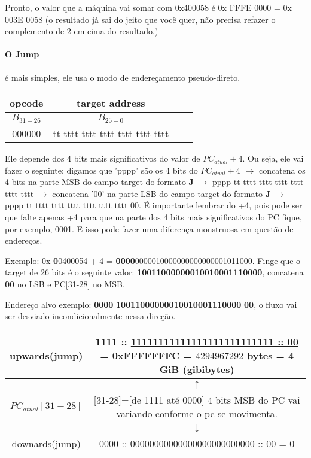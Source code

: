 \documentclass{article}
\begin{document}
Pronto, o valor que a máquina vai somar com 0x400058 é 0x FFFE 0000 = 0x 003E 
0058 (o resultado já sai do jeito que você quer, não precisa refazer o 
complemento de 2 em cima do resultado.)

\paragraph{O Jump} é mais simples, ele usa o modo de endereçamento 
pseudo-direto.

\begin{table}[ht!]
  \begin{tabular}{|c|c|c|c|}
    \hline opcode & target address \\ 
    \hline $B_{31-26}$ & $B_{25-0}$ \\ 
    \hline 000000 & tt tttt tttt tttt tttt tttt tttt \\ 
    \hline
  \end{tabular}
\end{table}

Ele depende dos 4 bits mais significativos do valor de $PC_{atual} + 4$. Ou 
seja, ele vai fazer o seguinte: digamos que 'pppp' são os 4 bits do $PC_{atual} 
+ 4$ $\rightarrow$ concatena os 4 bits na parte MSB do campo target do formato
\textbf{J} $\rightarrow$ pppp tt tttt tttt tttt tttt tttt tttt $\rightarrow$
concatena '00' na parte LSB do campo target do formato \textbf{J} $\rightarrow$
pppp tt tttt tttt tttt tttt tttt tttt 00. É importante lembrar do +4, pois pode 
ser que falte apenas +4 para que na parte dos 4 bits mais significativos do PC 
fique, por exemplo, 0001. E isso pode fazer uma diferença monstruosa em questão 
de endereços.

Exemplo: 0x\textbf{\color{Red} 0}0400054 + 4 = \textbf{\color{Red} 
0000}0000010000000000000001011000. Finge que o target de 26 bits é o seguinte 
valor: \textbf{\color{Blue} 10011000000010010001110000}, concatena 
\textbf{\color{Green} 00} no LSB e PC[31-28] no MSB.

Endereço alvo exemplo: \textbf{\color{Red} 0000}\textbf{\color{Blue}
10011000000010010001110000}\textbf{\color{Green} 00}, o fluxo vai ser desviado
incondicionalmente nessa direção.

\begin{table}[ht!]
\begin{tabular}{|c|c|}
\hline upwards(jump) & 1111 :: \underline{11111111111111111111111111 :: 00} = 
0xFFFFFFFC = ${4294967292}$ bytes = 4 GiB  (gibibytes)\\ 
\hline  & $\uparrow$ \\
\hline $PC_{atual}[31-28]$ & [31-28]=[de 1111 até 0000] \tiny{4 bits MSB do PC} 
vai variando conforme o pc se movimenta. 
\\
\hline  & $\downarrow$ \\
\hline downards(jump) & 0000 :: 00000000000000000000000000 :: 00 = 0 \\ 
\hline
\end{tabular}
\end{table}
\end{document}
